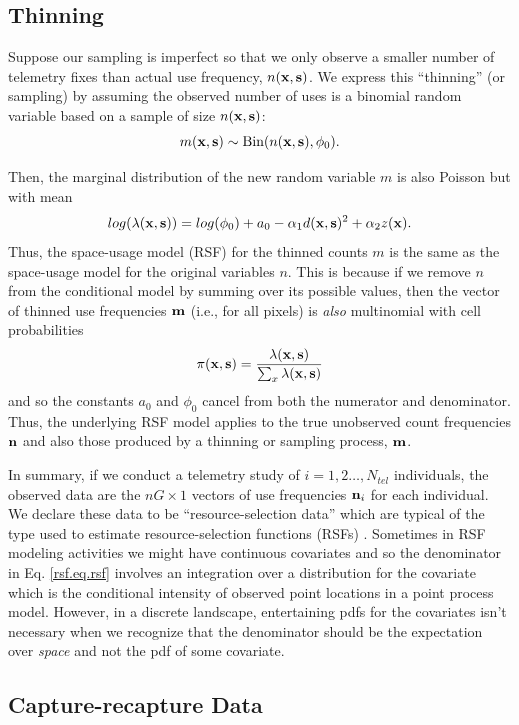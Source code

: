\documentclass[12pt]{article}
\begin{document}
\subsection{Thinning}

Suppose our sampling is imperfect so that we only observe a smaller
number of telemetry fixes than actual use frequency, $n({\bf x},{\bf s})$.
We express this ``thinning'' (or sampling) by assuming the observed number of
uses is a binomial random variable based on a sample of size $n({\bf
  x},{\bf s})$:
\[
 m({\bf x},{\bf s}) \sim \mbox{Bin}(n({\bf x},{\bf s}), \phi_{0}).
\]

 Then, the marginal distribution of the new random variable $m$ is
 also Poisson 
but with mean
\[
 log(\lambda({\bf x},{\bf s})) = log(\phi_{0}) + a_{0} -\alpha_{1}
 d({\bf x},{\bf s})^{2} +  \alpha_{2} z({\bf x}).
\]
 Thus, the space-usage model (RSF) for the
thinned counts $m$ is the same as the space-usage model for the
original variables $n$.  This is because if we remove $n$
from the conditional
 model by summing over its possible values, then the vector of thinned
 use frequencies
${\bf m}$ (i.e., for all pixels) is {\it also}  multinomial with cell probabilities
\[
\pi({\bf x},{\bf s}) = \frac{\lambda({\bf x},{\bf s})}{\sum_{x}  \lambda({\bf x},{\bf s})}
\]
and so the constants $a_{0}$ and $\phi_{0}$
cancel from both the numerator and
denominator. Thus, the underlying RSF model applies to the true
unobserved count frequencies ${\bf n}$ and also those produced
by a thinning or sampling process, ${\bf m}$.

In summary, if we conduct a telemetry study of $i=1,2\ldots,N_{tel}$
individuals, the observed data are
the $nG \times 1$  vectors of use frequencies ${\bf n}_{i}$ for each individual.
 We declare these data to be
``resource-selection data'' which are typical of the type used to
estimate resource-selection functions (RSFs) \citep{manly_etal:2002}.
Sometimes in RSF modeling activities we might have
continuous covariates and so the denominator in Eq. \ref{rsf.eq.rsf}
involves an integration over a distribution for the covariate which is
the conditional intensity of observed point locations in a point
process model. However, in a discrete landscape, entertaining pdfs for
the covariates isn't necessary \citep{royle_etal:2012mee} when we
recognize that the denominator should be the expectation over {\it
  space} and not the pdf of some covariate.


\subsection{Capture-recapture Data}
\end{document}
